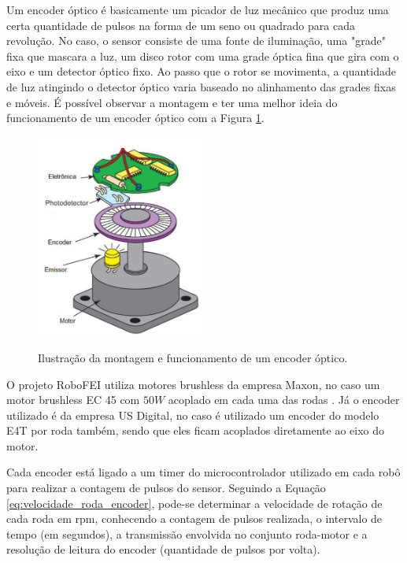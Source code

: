 \documentclass[acronym, symbols, table]{fei}
\begin{document}
				Um encoder óptico é basicamente um picador de luz mecânico que produz uma certa quantidade de pulsos na forma de um seno ou quadrado para cada revolução. No caso, o sensor consiste de uma fonte de iluminação, uma "grade" fixa que mascara a luz, um disco rotor com uma grade óptica fina que gira com o eixo e um detector óptico fixo. Ao passo que o rotor se movimenta, a quantidade de luz atingindo o detector óptico varia baseado no alinhamento das grades fixas e móveis. É possível observar a montagem e ter uma melhor ideia do funcionamento de um encoder óptico com a Figura \ref{fig:optical_encoder}.
				
				\begin{figure}[!htb]
					\centering
					\caption{Ilustração da montagem e funcionamento de um encoder óptico.} 
					\includegraphics[width=0.5\textwidth]{encoder_optico.png}
					\label{fig:optical_encoder}
				\end{figure}
				
				O projeto RoboFEI utiliza motores brushless da empresa Maxon\textregistered, no caso um motor brushless EC 45 com $50W$ acoplado em cada uma das rodas \cite{ec45_maxon}. Já o encoder utilizado é da empresa US Digital\textregistered \cite{e4t_encoder}, no caso é utilizado um encoder do modelo E4T por roda também, sendo que eles ficam acoplados diretamente ao eixo do motor.
				
				Cada encoder está ligado a um timer do microcontrolador utilizado em cada robô para realizar a contagem de pulsos do sensor. Seguindo a Equação \eqref{eq:velocidade_roda_encoder}, pode-se determinar a velocidade de rotação de cada roda em rpm, conhecendo a contagem de pulsos realizada, o intervalo de tempo (em segundos), a transmissão envolvida no conjunto roda-motor e a resolução de leitura do encoder (quantidade de pulsos por volta).
				
\end{document}
